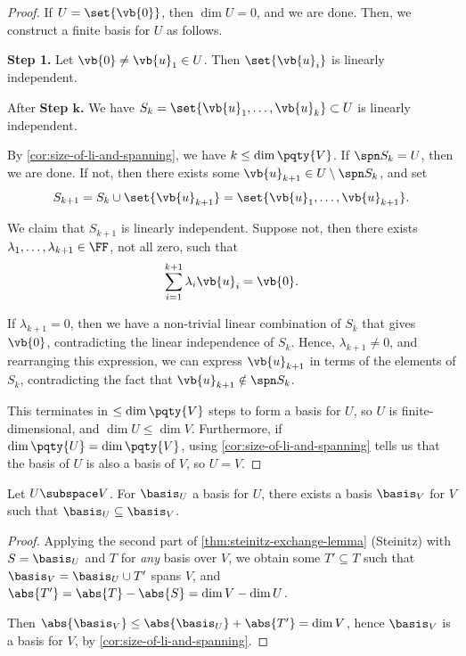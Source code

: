 \begin{proof}
    If \(U = \set{\vb{0}}\), then \(\dim U = 0\), and we are done. Then, we construct a finite basis for \(U\) as follows.

    \textbf{Step 1.} Let \(\vb{0} \neq \vb{u}_1 \in U\). Then \(\set{\vb{u}_i}\) is linearly independent.

    After \textbf{Step \(\boldsymbol k\).} We have \(S_k = \set{\vb{u}_1, \ldots, \vb{u}_k} \subset U\) is linearly independent.

    By \autoref{cor:size-of-li-and-spanning}, we have \(k \leq \dim \pqty{V}\). If \(\spn S_k = U\), then we are done. If not, then there exists some \(\vb{u}_{k + 1} \in U \setminus \spn S_k\), and set
    \[
        S_{k + 1} = S_k \cup \set{\vb{u}_{k + 1}} = \set{\vb{u}_1, \ldots, \vb{u}_{k + 1}}.
    \]

    We claim that \(S_{k + 1}\) is linearly independent. Suppose not, then there exists \(\lambda_1, \ldots, \lambda_{k + 1} \in \FF\), not all zero, such that
    \[
        \sum_{i = 1}^{k + 1} \lambda_i \vb{u}_i = \vb{0}.
    \]

    If \(\lambda_{k + 1} = 0\), then we have a non-trivial linear combination of \(S_k\) that gives \(\vb{0}\), contradicting the linear independence of \(S_k\). Hence, \(\lambda_{k + 1} \neq 0\), and rearranging this expression, we can express \(\vb{u}_{k + 1}\) in terms of the elements of \(S_k\), contradicting the fact that \(\vb{u}_{k + 1} \notin \spn S_k\).

    This terminates in \(\leq \dim\pqty{V}\) steps to form a basis for \(U\), so \(U\) is finite-dimensional, and \(\dim U \leq \dim V\). Furthermore, if \(\dim \pqty{U} = \dim \pqty{V}\), using \autoref{cor:size-of-li-and-spanning} tells us that the basis of \(U\) is also a basis of \(V\), so \(U = V\).
\end{proof}

\begin{proposition}
    Let \(U \subspace V\). For \(\basis_U\) a basis for \(U\), there exists a basis \(\basis_V\) for \(V\) such that \(\basis_U \subseteq \basis_V\).
\end{proposition}

\begin{proof}
    Applying the second part of \autoref{thm:steinitz-exchange-lemma} (Steinitz) with \(S = \basis_U\) and \(T\) for \emph{any} basis over \(V\), we obtain some \(T' \subseteq T\) such that \(\basis_V = \basis_U \cup T'\) spans \(V\), and \(\abs{T'} = \abs{T} - \abs{S} = \dim V - \dim U\).

    Then \(\abs{\basis_V} \leq \abs{\basis_U} + \abs{T'} = \dim V\), hence \(\basis_V\) is a basis for \(V\), by \autoref{cor:size-of-li-and-spanning}.
\end{proof}

